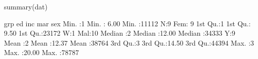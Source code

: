 \begin{Schunk}
\begin{Sinput}
     summary(dat)
\end{Sinput}
\begin{Soutput}
      grp          ed             inc        mar    sex    
 Min.   :1   Min.   : 6.00   Min.   :11112   N:9   Fem: 9  
 1st Qu.:1   1st Qu.: 9.50   1st Qu.:23172   W:1   Mal:10  
 Median :2   Median :12.00   Median :34333   Y:9           
 Mean   :2   Mean   :12.37   Mean   :38764                 
 3rd Qu.:3   3rd Qu.:14.50   3rd Qu.:44394                 
 Max.   :3   Max.   :20.00   Max.   :78787                 
\end{Soutput}
\end{Schunk}
